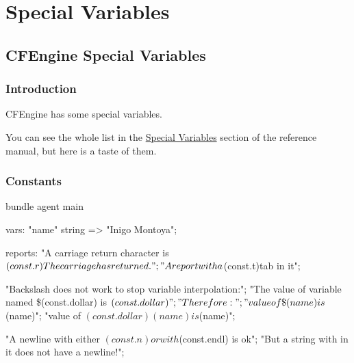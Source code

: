 



\chapter{Special Variables}





\section{CFEngine Special Variables}





\subsection{Introduction}

CFEngine has some special variables.

You can see the whole list in the \href{https://docs.cfengine.com/docs/3.12/reference-special-variables.html}{Special Variables}
section of the reference manual, but here is a taste of them.





\subsection{Constants}

\begin{codelisting}
\begin{code}
bundle agent main
{
  vars:
   "name"
     string => "Inigo Montoya";

  reports:
      "A carriage return character is $(const.r)The carriage has returned.";

      "A report with a$(const.t)tab in it";


      "Backslash does not work to stop variable interpolation:";
      "The value of variable named \$(const.dollar) is $(const.dollar)";
      "Therefore:";
      "value of \$(name) is $(name)";
      "value of $(const.dollar)(name) is $(name)";

      "A newline with either $(const.n) or with $(const.endl) is ok";
      "But a string with \n in it does not have a newline!";
}
\end{code}
\end{codelisting}





